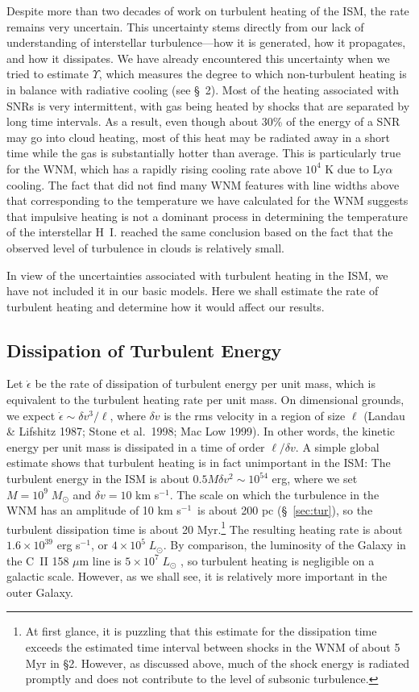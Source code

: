 \documentclass[12pt,preprint,flushrt]{aastex}
\newcommand{\e}{$^{-1}$}
\begin{document}
  Despite more than two decades of work on turbulent heating
of the ISM, the rate remains very uncertain.  This uncertainty
stems directly from our lack of understanding of interstellar
turbulence---how it is generated, how it propagates, and how
it dissipates.  We have already encountered this uncertainty
when we tried to estimate $\Upsilon$, which measures
the degree to which non-turbulent heating is in balance
with radiative cooling (see \S\ 2).
Most of the heating associated with SNRs is very
intermittent, with gas being heated by shocks
that are separated by long time intervals.  As
a result, even though about 30\% of the energy of
a SNR may go into cloud heating, most of this
heat may be radiated away in a short time while
the gas is substantially hotter than average.
This is particularly true for the WNM, which has a
rapidly rising cooling rate above $10^4$ K due to Ly$\alpha$
cooling.
The fact that \cite{hei02} did not
find many WNM features with line widths 
above that 
corresponding
to the temperature we have calculated
for the WNM suggests that
impulsive heating is not a dominant process in
determining the temperature of the interstellar H~I.
\cite{cox79} reached the same conclusion based on
the fact that the observed level of turbulence
in clouds is relatively small.

         In view of the uncertainties associated
with turbulent heating in the ISM, we have
not included it in our basic models.
Here we shall estimate the rate of turbulent heating
and determine how it would affect our results.

\subsection{Dissipation of Turbulent Energy}

   Let $\dot \epsilon$ be the rate of dissipation of
turbulent energy per unit mass, which is equivalent to
the turbulent heating rate per unit mass.  On dimensional
grounds, we expect $\dot\epsilon\sim \delta v^3/\ell$,
where $\delta v$ is the rms velocity in a region
of size $\ell$
(Landau \& Lifshitz 1987; Stone et al.\ 1998; Mac Low 1999).
In other words, the kinetic energy per unit mass is dissipated
in a time of order $\ell/\delta v$. A simple global estimate
shows that turbulent heating is in fact unimportant in
the ISM: The turbulent energy in the ISM is about
$0.5M\delta v^2\sim 10^{54}$ erg, where we set $M=10^9\; M_\odot$
and $\delta v=10$ km s\e.
The scale on which the turbulence in the WNM has an amplitude
of 10 km s\e\ is about 200 pc (\S~\ref{sec:tur}), so the turbulent dissipation
time is about 20 Myr.\footnote{At first glance, it is puzzling
that this estimate for the dissipation time exceeds the
estimated time interval between shocks in the WNM of about 5 Myr
in \S2.  However, as discussed above, much of the
shock energy is radiated
promptly and does not contribute to the level of subsonic
turbulence.}
The resulting heating rate is about
$1.6\times 10^{39}$ erg s\e, or $4\times 10^5\;L_\odot$.
By comparison, the luminosity of the Galaxy in the C~II
158 $\mu$m line is $5\times 10^7\;L_\odot$ \citep{wright91}, 
so turbulent
heating is negligible on a galactic scale.  However, as
we shall see, it is relatively more important in the outer
Galaxy.
\end{document}
